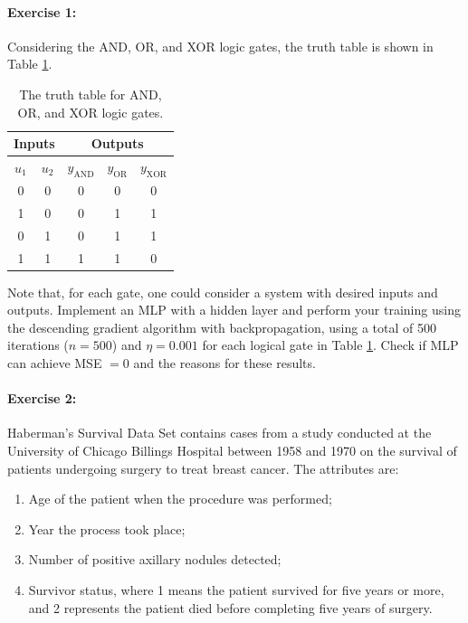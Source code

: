 \paragraph{\textbf{Exercise 1:}} Considering the AND, OR, and XOR logic gates, the truth table is shown in Table \ref{tab:verdade}.

\begin{table}[h!]
\caption{The truth table for AND, OR, and XOR logic gates.}
\label{tab:verdade}
\begin{center}
\begin{tabular}{cc|ccc}
\hline
\multicolumn{2}{c|}{Inputs} & \multicolumn{3}{c}{Outputs}                                  \\ \hline
$u_1$         & $u_2$        & $y_{\textrm{AND}}$ & $y_{\textrm{OR}}$ & $y_{\textrm{XOR}}$ \\ \hline
0             & 0            & 0                  & 0                 & 0                  \\
1             & 0            & 0                  & 1                 & 1                  \\
0             & 1            & 0                  & 1                 & 1                  \\
1             & 1            & 1                  & 1                 & 0                 \\ \hline
\end{tabular}
\end{center}
\end{table}

Note that, for each gate, one could consider a system with desired inputs and outputs. Implement an MLP with a hidden layer and perform your training using the descending gradient algorithm with backpropagation, using a total of 500 iterations ($n = 500$) and $\eta = 0.001$ for each logical gate in Table \ref{tab:verdade}. Check if MLP can achieve MSE $ = 0$ and the reasons for these results.

\paragraph{\textbf{Exercise 2:}} Haberman's Survival Data Set contains cases from a study conducted at the University of Chicago Billings Hospital between 1958 and 1970 on the survival of patients undergoing surgery to treat breast cancer. The attributes are:
\begin{enumerate}
	\item Age of the patient when the procedure was performed;
    	\item Year the process took place;
	\item Number of positive axillary nodules detected;
	\item Survivor status, where 1 means the patient survived for five years or more, and 2 represents the patient died before completing five years of surgery.
\end{enumerate}

